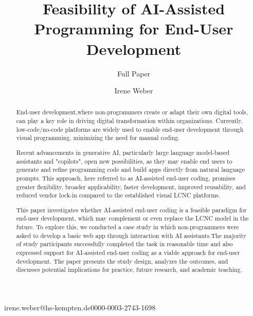 \documentclass[english,anonymous]{lni}
\begin{document}
\title[AI-Assisted Programming for EUD]{Feasibility of AI-Assisted Programming for End-User Development}
\subtitle{Full Paper}
 \author[1]{Irene Weber}{irene.weber@hs-kempten.de}{0000-0003-2743-1698}%


\maketitle



\begin{abstract}
End-user development,where non-programmers create   or adapt  their own digital tools, can play a key role in driving digital transformation within organizations. Currently, low-code/no-code  platforms are widely used to enable end-user development through visual programming, minimizing the need for manual coding.

Recent advancements in generative AI, particularly large language model-based assistants and "copilots", open new possibilities, as they may enable end users to generate and refine programming code and build apps directly from natural language prompts. This approach, here referred to as  AI-assisted end-user coding, promises greater flexibility, broader applicability, faster development, improved reusability, and reduced vendor lock-in compared to the established visual  LCNC platforms.

This paper investigates whether AI-assisted end-user coding  is a feasible paradigm for end-user development, which may complement or even replace the LCNC model in the future. To explore this, we conducted a case study in which non-programmers were asked to develop a basic web app   through interaction with AI assistants.The majority of study participants successfully completed the task in reasonable time and also expressed support for  AI-assisted end-user coding as a viable approach for end-user development. The paper presents the study design, analyzes the outcomes, and discusses  potential implications for practice, future research, and academic teaching.
\end{abstract}


\end{document}
